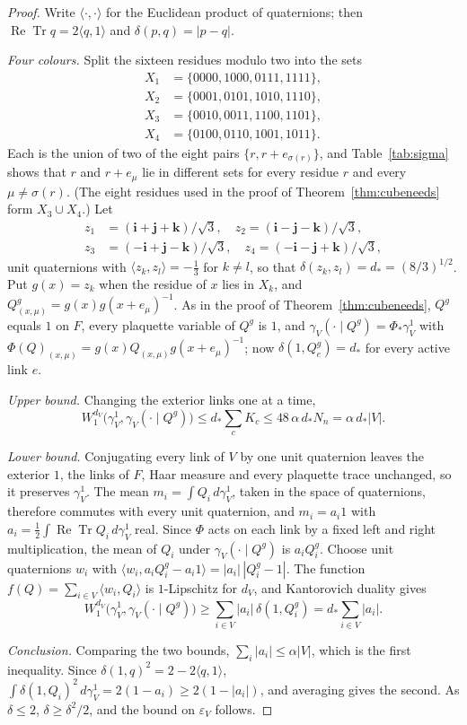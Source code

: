 \documentclass[11pt]{amsart}
\theoremstyle{definition}
\theoremstyle{remark}
\numberwithin{equation}{section}
\newcommand{\ReTr}{\operatorname{Re}\operatorname{Tr}}
\begin{document}
\begin{proof}
Write $\langle\cdot,\cdot\rangle$ for the Euclidean product of quaternions;
then $\ReTr q=2\langle q,1\rangle$ and $\delta(p,q)=|p-q|$.

\emph{Four colours.} Split the sixteen residues modulo two into the sets
\[
\begin{aligned}
X_1&=\{0000,1000,0111,1111\},\\
X_2&=\{0001,0101,1010,1110\},\\
X_3&=\{0010,0011,1100,1101\},\\
X_4&=\{0100,0110,1001,1011\}.
\end{aligned}
\]
Each is the union of two of the eight pairs $\{r,r+e_{\sigma(r)}\}$, and
Table~\ref{tab:sigma} shows that $r$ and $r+e_\mu$ lie in different sets for
every residue $r$ and every $\mu\ne\sigma(r)$. (The eight residues used in the
proof of Theorem~\ref{thm:cubeneeds} form $X_3\cup X_4$.) Let
\[
\begin{split}
z_1&=(\mathbf i+\mathbf j+\mathbf k)/\sqrt3,\quad
z_2=(\mathbf i-\mathbf j-\mathbf k)/\sqrt3,\\
z_3&=(-\mathbf i+\mathbf j-\mathbf k)/\sqrt3,\quad
z_4=(-\mathbf i-\mathbf j+\mathbf k)/\sqrt3,
\end{split}
\]
unit quaternions with $\langle z_k,z_l\rangle=-\frac13$ for $k\ne l$, so that
$\delta(z_k,z_l)=d_*=(8/3)^{1/2}$. Put $g(x)=z_k$ when the residue of $x$ lies
in $X_k$, and $Q^g_{(x,\mu)}=g(x)g(x+e_\mu)^{-1}$. As in the proof of
Theorem~\ref{thm:cubeneeds}, $Q^g$ equals $1$ on $F$, every plaquette
variable of $Q^g$ is $1$, and $\gamma_V(\cdot\mid Q^g)=\Phi_*\gamma^1_V$ with
$\Phi(Q)_{(x,\mu)}=g(x)Q_{(x,\mu)}g(x+e_\mu)^{-1}$; now
$\delta(1,Q^g_e)=d_*$ for every active link $e$.

\emph{Upper bound.} Changing the exterior links one at a time,
\[
W_1^{d_V}\bigl(\gamma^1_V,\gamma_V(\cdot\mid Q^g)\bigr)\le
d_*\sum_cK_c\le48\,\alpha\,d_*N_n=\alpha\,d_*|V| .
\]

\emph{Lower bound.} Conjugating every link of $V$ by one unit quaternion
leaves the exterior $1$, the links of $F$, Haar measure and every plaquette
trace unchanged, so it preserves $\gamma^1_V$. The mean $m_i=\int Q_i\,
d\gamma^1_V$, taken in the space of quaternions, therefore commutes with
every unit quaternion, and $m_i=a_i1$ with $a_i=\frac12\int\ReTr Q_i\,
d\gamma^1_V$ real. Since $\Phi$ acts on each link by a fixed left and right
multiplication, the mean of $Q_i$ under $\gamma_V(\cdot\mid Q^g)$ is $a_iQ^g_i$.
Choose unit quaternions $w_i$ with $\langle w_i,a_iQ^g_i-a_i1\rangle=
|a_i|\,|Q^g_i-1|$. The function $f(Q)=\sum_{i\in V}\langle w_i,Q_i\rangle$ is
$1$-Lipschitz for $d_V$, and Kantorovich duality gives
\[
W_1^{d_V}\bigl(\gamma^1_V,\gamma_V(\cdot\mid Q^g)\bigr)\ge
\sum_{i\in V}|a_i|\,\delta(1,Q^g_i)=d_*\sum_{i\in V}|a_i| .
\]

\emph{Conclusion.} Comparing the two bounds, $\sum_i|a_i|\le\alpha|V|$,
which is the first inequality. Since $\delta(1,q)^2=2-2\langle q,1\rangle$,
$\int\delta(1,Q_i)^2\,d\gamma^1_V=2(1-a_i)\ge2(1-|a_i|)$, and averaging gives
the second. As $\delta\le2$, $\delta\ge\delta^2/2$, and the bound on
$\varepsilon_V$ follows.
\end{proof}
\end{document}
